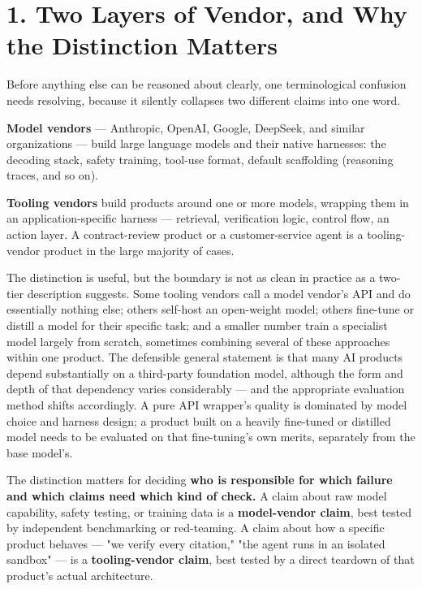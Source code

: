 \section{1. Two Layers of Vendor, and Why the Distinction Matters}

Before anything else can be reasoned about clearly, one terminological confusion needs resolving, because it silently collapses two different claims into one word.

\textbf{Model vendors} --- Anthropic, OpenAI, Google, DeepSeek, and similar organizations --- build large language models and their native harnesses: the decoding stack, safety training, tool-use format, default scaffolding (reasoning traces, and so on).

\textbf{Tooling vendors} build products around one or more models, wrapping them in an application-specific harness --- retrieval, verification logic, control flow, an action layer. A contract-review product or a customer-service agent is a tooling-vendor product in the large majority of cases.

The distinction is useful, but the boundary is not as clean in practice as a two-tier description suggests. Some tooling vendors call a model vendor's API and do essentially nothing else; others self-host an open-weight model; others fine-tune or distill a model for their specific task; and a smaller number train a specialist model largely from scratch, sometimes combining several of these approaches within one product. The defensible general statement is that many AI products depend substantially on a third-party foundation model, although the form and depth of that dependency varies considerably --- and the appropriate evaluation method shifts accordingly. A pure API wrapper's quality is dominated by model choice and harness design; a product built on a heavily fine-tuned or distilled model needs to be evaluated on that fine-tuning's own merits, separately from the base model's.

The distinction matters for deciding \textbf{who is responsible for which failure and which claims need which kind of check.} A claim about raw model capability, safety testing, or training data is a \textbf{model-vendor claim}, best tested by independent benchmarking or red-teaming. A claim about how a specific product behaves --- "we verify every citation," "the agent runs in an isolated sandbox" --- is a \textbf{tooling-vendor claim}, best tested by a direct teardown of that product's actual architecture.

